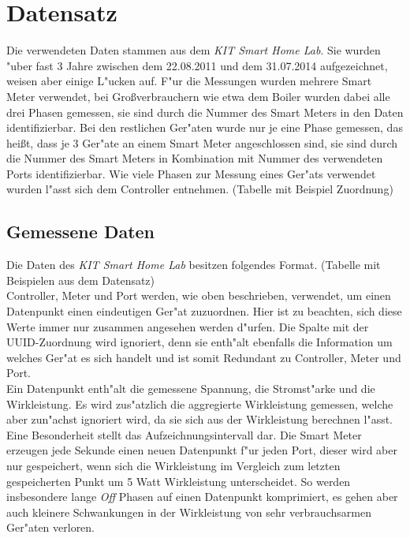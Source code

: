 \section{Datensatz}
\label{Datensatz}

Die verwendeten Daten stammen aus dem \textit{KIT Smart Home Lab}. Sie wurden "uber fast 3 Jahre zwischen dem 22.08.2011 und dem 31.07.2014 aufgezeichnet, weisen aber einige L"ucken auf. F"ur die Messungen wurden mehrere Smart Meter verwendet, bei Gro{\ss}verbrauchern wie etwa dem Boiler wurden dabei alle drei Phasen gemessen, sie sind durch die Nummer des Smart Meters in den Daten identifizierbar. Bei den restlichen Ger"aten wurde nur je eine Phase gemessen, das hei{\ss}t, dass je 3 Ger"ate an einem Smart Meter angeschlossen sind, sie sind durch die Nummer des Smart Meters in Kombination mit Nummer des verwendeten Ports identifizierbar. Wie viele Phasen zur Messung eines Ger"ats verwendet wurden l"asst sich dem Controller entnehmen. (Tabelle mit Beispiel Zuordnung)


\subsection{Gemessene Daten}
\label{Gemessene Daten}

Die Daten des \textit{KIT Smart Home Lab} besitzen folgendes Format. (Tabelle mit Beispielen aus dem Datensatz) \\

Controller, Meter und Port werden, wie oben beschrieben, verwendet, um einen Datenpunkt einen eindeutigen Ger"at zuzuordnen. Hier ist zu beachten, sich diese Werte immer nur zusammen angesehen werden d"urfen.
Die Spalte mit der UUID-Zuordnung wird ignoriert, denn sie enth"alt ebenfalls die Information um welches Ger"at es sich handelt und ist somit Redundant zu Controller, Meter und Port. \\
Ein Datenpunkt enth"alt die gemessene Spannung, die Stromst"arke und die Wirkleistung. Es wird zus"atzlich die aggregierte Wirkleistung gemessen, welche aber zun"achst ignoriert wird, da sie sich aus der Wirkleistung berechnen l"asst. \\
Eine Besonderheit stellt das Aufzeichnungsintervall dar. Die Smart Meter erzeugen jede Sekunde einen neuen Datenpunkt f"ur jeden Port, dieser wird aber nur gespeichert, wenn sich die Wirkleistung im Vergleich zum letzten gespeicherten Punkt um 5 Watt Wirkleistung unterscheidet. So werden insbesondere lange \textit{Off} Phasen auf einen Datenpunkt komprimiert, es gehen aber auch kleinere Schwankungen in der Wirkleistung von sehr verbrauchsarmen Ger"aten verloren.


